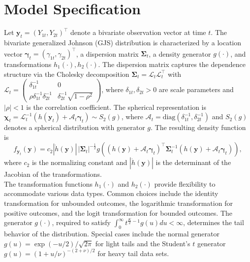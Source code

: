 \documentclass[twoside]{article}
\begin{document}
\section{Model Specification} \label{sec2}
Let $\boldsymbol{y}_{t} = (Y_{1t}, Y_{2t})^{\intercal}$ denote a bivariate observation vector at time $t$. The bivariate generalized Johnson (GJS) distribution is characterized by a location vector $\boldsymbol{\gamma}_{t}=(\gamma_{1t},\gamma_{2t})^{\intercal}$, a dispersion matrix $\boldsymbol{\Sigma}_{t}$, a density generator $g(\cdot)$, and transformations $h_1(\cdot), h_2(\cdot)$. The dispersion matrix captures the dependence structure via the Cholesky decomposition $\boldsymbol{\Sigma}_{t} = \boldsymbol{\mathcal{L}}_{t}\boldsymbol{\mathcal{L}}_{t}^{\intercal}$ with $\boldsymbol{\mathcal{L}}_{t} = \begin{pmatrix} \delta_{1t}^{-1} & 0 \\ \rho \delta_{1t}^{-1}\delta_{2t}^{-1} & \delta_{2t}^{-1}\sqrt{1-\rho^2} \end{pmatrix}$, where $\delta_{1t}, \delta_{2t} > 0$ are scale parameters and $|\rho| < 1$ is the correlation coefficient. The spherical representation is $\boldsymbol{\chi}_{t} = \boldsymbol{\mathcal{L}}_{t}^{-1}(h(\boldsymbol{y}_{t}) + \boldsymbol{\mathcal{A}}_{t}\boldsymbol{\gamma}_{t}) \sim S_2(g)$, where $\boldsymbol{\mathcal{A}}_{t} = \text{diag}(\delta_{1t}^{-1}, \delta_{2t}^{-1})$ and $S_2(g)$ denotes a spherical distribution with generator $g$. The resulting density function is
\[
f_{\boldsymbol{y}_{t}}(\boldsymbol{y}) = c_2 |\dot{h}(\boldsymbol{y})| \, |\boldsymbol{\Sigma}_{t}|^{-\frac{1}{2}} g\left((h(\boldsymbol{y}) + \boldsymbol{\mathcal{A}}_{t}\boldsymbol{\gamma}_{t})^{\intercal} \boldsymbol{\Sigma}_{t}^{-1} (h(\boldsymbol{y}) + \boldsymbol{\mathcal{A}}_{t}\boldsymbol{\gamma}_{t})\right),
\]
where $c_2$ is the normalizing constant and $|\dot{h}(\boldsymbol{y})|$ is the determinant of the Jacobian of the transformations.\\
The transformation functions $h_1(\cdot)$ and $h_2(\cdot)$ provide flexibility to accommodate various data types. Common choices include the identity transformation for unbounded outcomes, the logarithmic transformation for positive outcomes, and the logit transformation for bounded outcomes. The generator $g(\cdot)$, required to satisfy $\int_{0}^{\infty} t^{\frac{K}{2}-1} g(u) du < \infty$, determines the tail behavior of the distribution. Special cases include the normal generator $g(u) = \exp(-u/2)/\sqrt{2\pi}$ for light tails and the Student's $t$ generator $g(u) = (1+u/\nu)^{-(2+\nu)/2}$ for heavy tail data sets.\\
\end{document}
